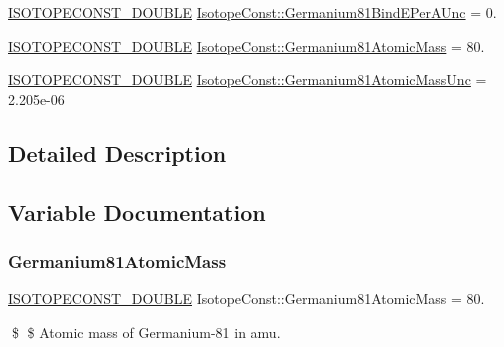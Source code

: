 \begin{DoxyCompactItemize}
\mbox{\hyperlink{group___isotope_const-_macros_ga8f45a7272ce02c0b4c65c44636ed719a}{I\+S\+O\+T\+O\+P\+E\+C\+O\+N\+S\+T\+\_\+\+D\+O\+U\+B\+LE}} \mbox{\hyperlink{group___isotope_const-_germanium-_ge81_ga2b8e6137feb7031acff1de6f609ce072}{Isotope\+Const\+::\+Germanium81\+Bind\+E\+Per\+A\+Unc}} = 0.
\item 
\mbox{\hyperlink{group___isotope_const-_macros_ga8f45a7272ce02c0b4c65c44636ed719a}{I\+S\+O\+T\+O\+P\+E\+C\+O\+N\+S\+T\+\_\+\+D\+O\+U\+B\+LE}} \mbox{\hyperlink{group___isotope_const-_germanium-_ge81_gabf0c92bb379abd0fb7188aabef45d699}{Isotope\+Const\+::\+Germanium81\+Atomic\+Mass}} = 80.
\item 
\mbox{\hyperlink{group___isotope_const-_macros_ga8f45a7272ce02c0b4c65c44636ed719a}{I\+S\+O\+T\+O\+P\+E\+C\+O\+N\+S\+T\+\_\+\+D\+O\+U\+B\+LE}} \mbox{\hyperlink{group___isotope_const-_germanium-_ge81_ga714a243975b64692369b7996829d689f}{Isotope\+Const\+::\+Germanium81\+Atomic\+Mass\+Unc}} = 2.\+205e-\/06
\end{DoxyCompactItemize}


\subsection{Detailed Description}


\subsection{Variable Documentation}
\mbox{\label{group___isotope_const-_germanium-_ge81_gabf0c92bb379abd0fb7188aabef45d699}} 
\subsubsection{\texorpdfstring{Germanium81\+Atomic\+Mass}{Germanium81AtomicMass}}
{\footnotesize\ttfamily \mbox{\hyperlink{group___isotope_const-_macros_ga8f45a7272ce02c0b4c65c44636ed719a}{I\+S\+O\+T\+O\+P\+E\+C\+O\+N\+S\+T\+\_\+\+D\+O\+U\+B\+LE}} Isotope\+Const\+::\+Germanium81\+Atomic\+Mass = 80.}

\$ \$ Atomic mass of Germanium-\/81 in amu. \mbox{\label{group___isotope_const-_germanium-_ge81_ga714a243975b64692369b7996829d689f}} 
